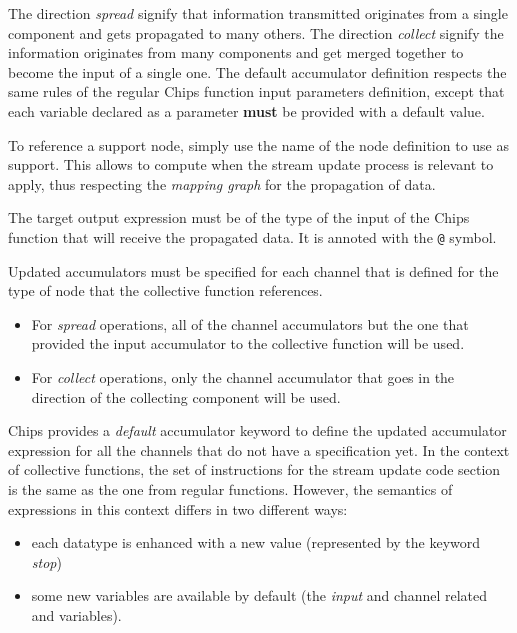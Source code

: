 \documentclass{article}
\begin{document}
The direction \emph{spread} signify that information transmitted originates from a single component and gets propagated to many others. The direction \emph{collect} signify the information originates from many components and get merged together to become the input of a single one.
The default accumulator definition respects the same rules of the regular Chips function input parameters definition, except that each variable declared as a parameter \textbf{must} be provided with a default value.

To reference a support node, simply use the name of the node definition to use as support. This allows to compute when the stream update process is relevant to apply, thus respecting the \emph{mapping graph} for the propagation of data.

The target output expression must be of the type of the input of the Chips function that will receive the propagated data. It is annoted with the \texttt{@} symbol.

Updated accumulators must be specified for each channel that is defined for the type of node that the collective function references.
\begin{itemize}
    \item For \emph{spread} operations, all of the channel accumulators but the one that provided the input accumulator to the collective function will be used.
    \item For \emph{collect} operations, only the channel accumulator that goes in the direction of the collecting component will be used.
\end{itemize}

Chips provides a \emph{default} accumulator keyword to define the updated accumulator expression for all the channels that do not have a specification yet.
In the context of collective functions, the set of instructions for the stream update code section is the same as the one from regular functions. However, the semantics of expressions in this context differs in two different ways:
\begin{itemize}
    \item each datatype is enhanced with a new value (represented by the keyword \emph{stop})
    \item some new variables are available by default (the \emph{input} and channel related and variables).
\end{itemize}
\end{document}
